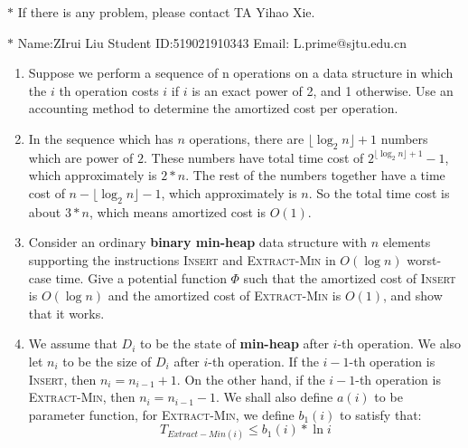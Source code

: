 \documentclass[12pt,a4paper]{article}
\makeatletter
\newtheorem*{solution}{Solution}
\theoremstyle{definition}
\renewenvironment{solution}[1][Solution] {\par\pushQED{\qed}\normalfont\topsep6\p@\@plus6\p@\relax\trivlist\item[\hskip\labelsep\bfseries#1\@addpunct{.}]\ignorespaces}{\popQED\endtrivlist\@endpefalse} \makeatother
\makeatother
\begin{document}
\noindent

\noindent{}
\begin{center}
\footnotesize{\color{red}$*$ If there is any problem, please contact TA Yihao Xie. }

\footnotesize{\color{blue}$*$ Name:ZIrui Liu  \quad Student ID:519021910343 \quad Email: L.prime@sjtu.edu.cn}
\end{center}
\begin{enumerate}
	\item Suppose we perform a sequence of n operations on a data structure in which the $i$ th 		operation costs $i$ if $i$ is an exact power of 2, and 1 otherwise. Use an accounting method to determine the amortized cost per operation.
	
	\begin{solution}
	In the sequence which has $n$ operations, there are $\lfloor \log_2{n} \rfloor +1$ numbers which are power of $2$. These numbers have total time cost of $2^{ \lfloor \log_2{n} \rfloor +1 } -1$, which approximately is $2*n$. The rest of the numbers together have a time cost of $n- \lfloor \log_2{n} \rfloor -1$, which approximately is $n$. So the total time cost is about $3*n$, which means amortized cost is $O\left(1\right)$.
	
	\end{solution}
	

	\item Consider an ordinary \textbf{binary min-heap} data structure with $n$ elements supporting
the instructions \textsc{Insert} and \textsc{Extract-Min} in $O(\log n)$ worst-case time. Give a
potential function $\Phi$ such that the amortized cost of \textsc{Insert} is $O(\log n)$ and the
amortized cost of \textsc{Extract-Min} is $O(1)$, and show that it works.

    \begin{solution}
	We assume that $D_i$ to be the state of \textbf{min-heap} after $i$-th operation. We also let $n_i$ to be the size of $D_i$ after $i$-th operation. If the $i-1$-th operation is \textsc{Insert}, then $n_i = n_{i-1}+1$. On the other hand, if the $i-1$-th operation is \textsc{Extract-Min}, then $n_i = n_{i-1}-1$. We shall also define $a\left(i\right)$ to be parameter function, for \textsc{Extract-Min}, we define $b_1\left(i\right)$ to satisfy that:\\
	\begin{equation}
	T_{Extract-Min \left(i\right) } \leq b_1\left(i\right) * \ln i 
	\end{equation}
	

\end{solution}
\end{enumerate}
\end{document}
